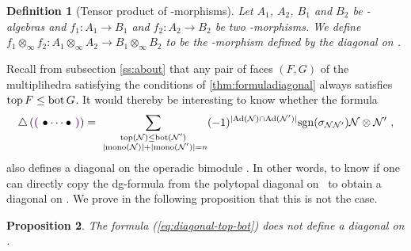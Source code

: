 \documentclass[twoside, 12pt]{amsart}
\newtheorem{definition}{Definition}[section]
\newtheorem{proposition}[definition]{Proposition}
\theoremstyle{remark}
\begin{document}
\begin{definition}[Tensor product of \Ainf -morphisms]
Let $A_1$, $A_2$, $B_1$ and $B_2$ be \Ainf -algebras and $f_1 : A_1 \rightarrow B_1$ and $f_2 : A_2 \rightarrow B_2$ be two \Ainf -morphisms. We define $f_1 \otimes_{\infty} f_2 : A_1 \otimes_\infty A_2 \rightarrow B_1 \otimes_\infty B_2$ to be the \Ainf -morphism defined by the diagonal \diagminf on \Minf .
\end{definition}

Recall from subsection \ref{ss:about} that any pair of faces $(F,G)$ of the multiplihedra satisfying the conditions of \cref{thm:formuladiagonal} always satisfies $\operatorname{top} F \leq \operatorname{bot} G$. It would thereby be interesting to know whether the formula
\begin{align}
\triangle \left( \purple{\bullet \cdots \bullet} \right) = 
\sum_{\substack{
    \tp(\mathcal{N}) \leq \bm(\mathcal{N'}) \\
  \ |\mono(\mathcal{N})|+|\mono(\mathcal{N}')|=n
}}
(-1)^{|\mathrm{Ad}(\mathcal{N})\cap \mathrm{Ad}(\mathcal{N}')|}\mathrm{sgn}(\sigma_{\mathcal{N}\mathcal{N}'})\mathcal{N} \otimes \mathcal{N}' \ , 
\label{eq:diagonal-top-bot}
\end{align}
also defines a diagonal on the operadic bimodule \Minf . In other words, to know if one can directly copy the dg-formula from the polytopal diagonal on \Ainf\ to obtain a diagonal on \Minf . We prove in the following proposition that this is not the case. 

\begin{proposition}
\label{prop:non-a-topbot}
The formula (\ref{eq:diagonal-top-bot}) does not define a diagonal on \Minf .
\end{proposition}
\end{document}
